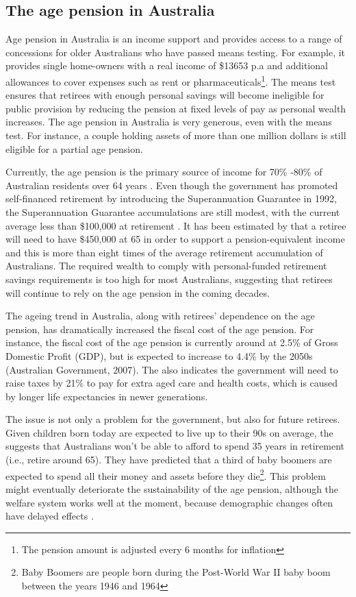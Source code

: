\documentclass[11pt,a4paper,]{article}
\begin{document}
\hypertarget{the-age-pension-in-australia}{%
\subsection{The age pension in Australia}\label{the-age-pension-in-australia}}

Age pension in Australia is an income support and provides access to a range of concessions for older Australians who have passed means testing. For example, it provides single home-owners with a real income of \$13653 p.a and additional allowances to cover expenses such as rent or pharmaceuticals\footnote{The pension amount is adjusted every 6 months for inflation}. The means test ensures that retirees with enough personal savings will become ineligible for public provision by reducing the pension at fixed levels of pay as personal wealth increases. The age pension in Australia is very generous, even with the means test. For instance, a couple holding assets of more than one million dollars is still eligible for a partial age pension.

Currently, the age pension is the primary source of income for 70\% -80\% of Australian residents over 64 years \autocite{ABS06}. Even though the government has promoted self-financed retirement by introducing the Superannuation Guarantee in 1992, the Superannuation Guarantee accumulations are still modest, with the current average less than \$100,000 at retirement \autocite{ASFA07}. It has been estimated by \textcite{PT08} that a retiree will need to have \$450,000 at 65 in order to support a pension-equivalent income and this is more than eight times of the average retirement accumulation of Australians. The required wealth to comply with personal-funded retirement savings requirements is too high for most Australians, suggesting that retirees will continue to rely on the age pension in the coming decades.

The ageing trend in Australia, along with retirees' dependence on the age pension, has dramatically increased the fiscal cost of the age pension. For instance, the fiscal cost of the age pension is currently around at 2.5\% of Gross Domestic Profit (GDP), but is expected to increase to 4.4\% by the 2050s (Australian Government, 2007). The \textcite{PC13} also indicates the government will need to raise taxes by 21\% to pay for extra aged care and health costs, which is caused by longer life expectancies in newer generations.

The issue is not only a problem for the government, but also for future retirees. Given children born today are expected to live up to their 90s on average, the \textcite{PC13} suggests that Australians won't be able to afford to spend 35 years in retirement (i.e., retire around 65). They have predicted that a third of baby boomers are expected to spend all their money and assets before they die\footnote{Baby Boomers are people born during the Post-World War II baby boom between the years 1946 and 1964}. This problem might eventually deteriorate the sustainability of the age pension, although the welfare system works well at the moment, because demographic changes often have delayed effects \autocite{IGR02}.
\end{document}
